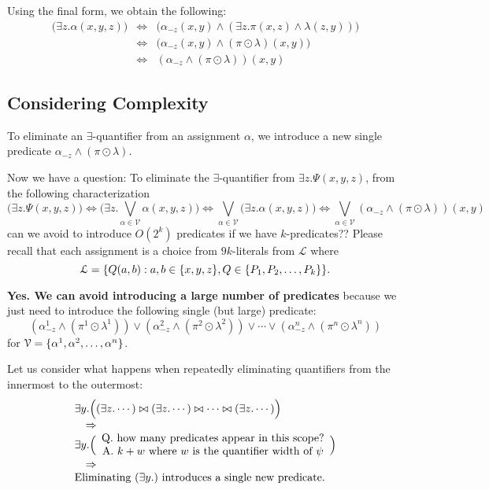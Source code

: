 \documentclass[a4paper,UKenglish,cleveref, autoref, thm-restate]{lipics-v2021}
\begin{document}
Using the final form, we obtain the following:
$$
\begin{array}{lcl}
\biggl(\exists z. \alpha(x, y, z)\biggr) & \iff &
\biggl(\alpha_{-z}(x, y) \land (\exists z. \pi(x, z) \land \lambda(z, y))\biggr) \\
& \iff & \biggl(\alpha_{-z}(x, y) \land (\pi \odot \lambda)(x, y)\biggr) \\
& \iff & (\alpha_{-z} \land (\pi \odot \lambda))(x, y)
\end{array}
$$

\subsection{Considering Complexity}
To eliminate an $\exists$-quantifier from an assignment $\alpha$, we introduce a new single predicate $\alpha_{-z} \land (\pi \odot \lambda)$.

Now we have a question:
To eliminate the $\exists$-quantifier from $\exists z. \Psi(x, y, z)$,
from the following characterization
$$
\biggl(\exists z. \Psi(x,y, z)\biggr)
\iff \biggl(\exists z. \bigvee_{\alpha \in \mathcal{V}} \alpha(x, y, z)\biggr)
\iff \bigvee_{\alpha \in \mathcal{V}} \biggl(\exists z. \alpha(x, y, z)\biggr)
\iff \bigvee_{\alpha \in \mathcal{V}} (\alpha_{-z} \land (\pi \odot \lambda))(x, y)
$$
can we avoid to introduce $O(2^k)$ predicates if we have $k$-predicates??
Please recall that each assignment is a choice from $9k$-literals from $\mathcal{L}$ where
$$
\mathcal{L} = \{ Q(a, b) : a, b \in \{x, y, z\}, Q \in \{P_1, P_2, \ldots, P_k\} \}.
$$

\textbf{Yes. We can avoid introducing a large number of predicates} because
we just need to introduce the following single (but large) predicate:
$$
(\alpha^1_{-z} \land (\pi^1 \odot \lambda^1)) \lor (\alpha^2_{-z} \land (\pi^2 \odot \lambda^2)) \lor \cdots \lor (\alpha^n_{-z} \land (\pi^n \odot \lambda^n))
$$
for $\mathcal{V} = \{ \alpha^1, \alpha^2, \ldots, \alpha^n \}$.

Let us consider what happens when repeatedly eliminating quantifiers from the innermost to the outermost:
$$
\begin{array}{l}
\exists y.
\Bigl(
(\exists z. \cdots) \bowtie (\exists z. \cdots) \bowtie \cdots \bowtie (\exists z. \cdots)
\Bigr) \\
\quad \Rightarrow \\
\exists y. \Bigl(
\begin{array}{c}
\text{Q. how many predicates appear in this scope?} \\
\text{A. $k + w$ where $w$ is the quantifier width of $\psi$}
\end{array}
\Bigr) \\
\quad \Rightarrow \\
\text{Eliminating $(\exists y.)$ introduces a single new predicate.}
\end{array}
$$
\end{document}

